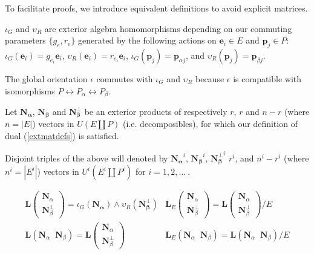 \documentclass[Unicode]{cedram-alco}
\newcommand{\ext}[1]{\ensuremath{\mathbf{#1}}}
\newcommand{\eNal}{\ensuremath{\ext{N}_{\alpha}}}
\newcommand{\eNbePe}{\ensuremath{\ext{N}_{\beta}^{\perp}}}
\newcommand{\eNbe}{\ensuremath{\ext{N}_\beta}}
\newcommand{\Is}{\ensuremath{\iota}}
\newcommand{\Vs}{\ensuremath{\upsilon}}
\newcommand{\dunion}{\coprod}
\newcommand{\extLVert}[2]{\ext{L}\left( \begin{array}{c} {#1}\\ {#2} \end{array} \right)}
\newcommand{\LVert}[2]{\ext{L}\left( \begin{array}{c} {#1}\\ {#2} \end{array} \right)}
\newcommand{\LVertSub}[3]{\ext{L}_{#1}\left( \begin{array}{c} {#2}\\ {#3} \end{array} \right)}
\newcommand{\LHor}[2]{\ext{L}\left( {#1}\;\; {#2} \right)}
\newcommand{\LHorSub}[3]{\ext{L}_{#1}\left(  {#2}\;\; {#3}  \right)}
\begin{document}
To facilitate proofs, we introduce equivalent definitions to avoid explicit matrices.
\begin{defi}
  $\Is_G$ and $\Vs_R$ are exterior algebra homomorphisms depending on our commuting parameters
  $\{g_e, r_e\}$ generated by
  the following actions on $\ext{e}_i\in E$ and $\ext{p}_j\in P$:
  $\Is_G(\ext{e}_i)= g_{e_i}\ext{e}_i$, $\Vs_R(\ext{e}_i)=r_{e_i}\ext{e}_i$,
  $\Is_G(\ext{p}_j)=\ext{p}_{\alpha j}$, and   $\Vs_R(\ext{p}_j)=\ext{p}_{\beta j}$.
\end{defi}

The global orientation $\epsilon$
commutes with $\Is_G$ and $\Vs_R$ because $\epsilon$ is compatible with
isomorphisms
$P \leftrightarrow P_{\alpha}\leftrightarrow P_{\beta}$.

\begin{defi}
  Let $\ext{N_\alpha}$,  $\ext{N_\beta}$ and $\ext{N_\beta^\perp}$ be an exterior products
  of respectively
  $r$, $r$ and $n-r$ (where $n=|E|$)  vectors in $U(E\dunion P)$
  (i.e. decomposibles), for which our  
  definition of dual (\ref{extmatdefs}) is satisfied.

  Disjoint triples of the above will denoted by
  $\ext{N_\alpha}^{i}$,  $\ext{N_\beta}^{i}$, $\ext{N_\beta^\perp}^{i}$ 
  $r^{i}$, and $n^{i}-r^{i}$ (where $n^{i}=|E^{i}|$)  vectors in
  $U^{i}(E^{i}\dunion P^{i})$ for $i=1, 2, \ldots\ $.

\end{defi}

\begin{defi}
  \begin{equation}
  \begin{array}{cc}
    \LVert{\eNal}{\eNbePe} = \Is_G(\ext{N_\alpha})\wedge\Vs_R(\ext{N_{\beta}^\perp}) &
    \LVertSub{E}{\eNal}{\eNbePe} = \LVert{\eNal}{\eNbePe}/E\\
    \LHor{\eNal}{\eNbe}=\extLVert{\eNal}{\eNbePe} &
    \LHorSub{E}{\eNal}{\eNbe}=\LHor{\eNal}{\eNbe}/E
  \end{array}
  \end{equation}
\end{defi}
\end{document}
